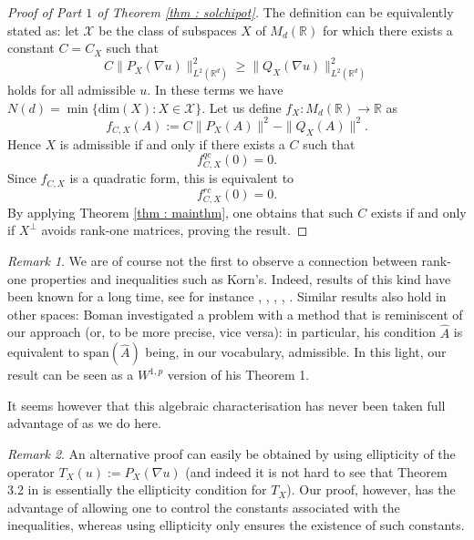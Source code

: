 \documentclass[11pt, a4paper, reqno]{elsarticle}
\theoremstyle{definition}
\theoremstyle{remark}
\newtheorem{remark}{Remark}
\begin{document}
\begin{proof}[Proof of Part $1$ of Theorem \ref{thm : solchipot}]
The definition can be equivalently  stated as:
let $\mathcal X$ be the class of subspaces $X$ of $M_d(\mathbb{R})$
for which there exists a constant $C=C_X$ such that
\begin{equation*}
 C\|P_X(\nabla u)\|_{L^2(\mathbb{R}^d)}^2\ge \|Q_X(\nabla u)\|_{L^2(\mathbb{R}^d)}^2   
\end{equation*}
holds
for all admissible $u$. In these
terms we have $N(d)=\min\{\mathrm{dim}(X)\colon X\in\mathcal X\}$.
Let us define $f_X\colon M_d(\mathbb{R})\to \mathbb{R}$ as
\begin{equation*}
	f_{C,X}(A)
:=
	C\|P_X(A)\|^2
-
	\|Q_X(A)\|^2.
\end{equation*}
Hence $X$ is admissible if and only
if there exists a $C$ such that
\begin{equation*}
	f_{C,X}^{qc}(0)
=
	0.
\end{equation*}
Since $f_{C,X}$ is a quadratic form, 
this is equivalent to 
\begin{equation*}
	f_{C,X}^{rc}(0)
=
	0.
\end{equation*}
By applying Theorem \ref{thm : mainthm}, 
one obtains that such  $C$ exists if and only if $X^\perp$
avoids rank-one matrices, proving the result.
\end{proof}
\begin{remark}\label{rmk : hist}
    We are of course not the first to observe
    a connection between rank-one
    properties and inequalities such 
    as Korn's. Indeed, results of this kind have been known
    for a long time, see for instance \cite{Chen2017OnIntegrals},
    \cite[Lemma 2.7]{Muller1999VariationalTransitions},
    \cite{Conti2005AFunctions}, \cite{Faraco2022}, \cite{KirchheimJan}.
    Similar
    results also hold in other spaces: Boman \cite{Boman1967PartialSpaces} 
    investigated
    a problem with a method that
    is reminiscent of our
    approach (or, to be 
    more precise, vice versa): in particular, his condition
    $\hat A$ is equivalent to 
    $\mathrm{span}(\hat A)$ being,
    in our vocabulary, admissible. In 
    this light, our result can be seen
    as a $W^{1,p}$ version of 
    his Theorem 1. \par
    It seems however that
    this algebraic characterisation
    has never been taken full advantage of as we do here.\end{remark}
\begin{remark}
An alternative proof can easily be obtained by 
using ellipticity of the operator $T_X(u):=P_X(\nabla u)$
(and indeed it is not hard to see that 
Theorem 3.2 in \cite{Chipot2021OnType}
is essentially the ellipticity condition for $T_X$).
Our proof, however, has the advantage of allowing one to
control the constants associated with the inequalities,
whereas using ellipticity only ensures the existence of such
constants.
\end{remark}
\end{document}
